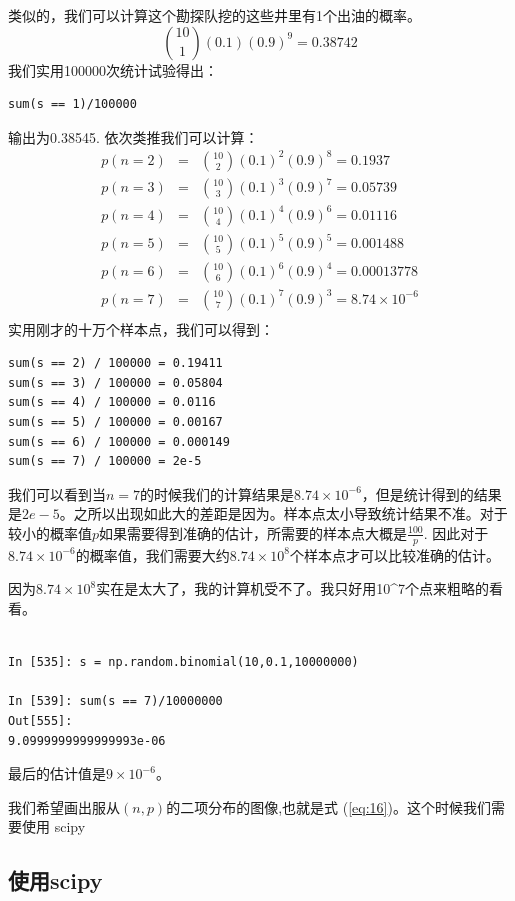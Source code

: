 \documentclass[10pt,a4paper,UTF8]{article}
\begin{document}
类似的，我们可以计算这个勘探队挖的这些井里有1个出油的概率。
\begin{equation}
\label{eq:14}
\binom{10}{1}(0.1)(0.9)^{9} = 0.38742
\end{equation}
我们实用100000次统计试验得出：
\lstset{language=Python,label= ,caption= ,captionpos=b,numbers=none}
\begin{lstlisting}
sum(s == 1)/100000
\end{lstlisting}
输出为0.38545.
依次类推我们可以计算：
\begin{eqnarray}
\label{eq:16}
p(n=2)&=&\binom{10}{2}(0.1)^{2}(0.9)^{8} = 0.1937  \\
p(n=3)&=&\binom{10}{3}(0.1)^{3}(0.9)^{7} = 0.05739 \\
p(n=4)&=&\binom{10}{4}(0.1)^{4}(0.9)^{6} = 0.01116  \\
p(n=5)&=&\binom{10}{5}(0.1)^{5}(0.9)^{5} = 0.001488 \\
p(n=6)&=&\binom{10}{6}(0.1)^{6}(0.9)^{4} = 0.00013778  \\
p(n=7)&=&\binom{10}{7}(0.1)^{7}(0.9)^{3} = 8.74\times 10^{-6}   \\
\end{eqnarray}
实用刚才的十万个样本点，我们可以得到：
\begin{verbatim}
sum(s == 2) / 100000 = 0.19411
sum(s == 3) / 100000 = 0.05804
sum(s == 4) / 100000 = 0.0116
sum(s == 5) / 100000 = 0.00167
sum(s == 6) / 100000 = 0.000149
sum(s == 7) / 100000 = 2e-5
\end{verbatim}
我们可以看到当\(n=7\)的时候我们的计算结果是\(8.74\times 10^{-6}\)，但是统计得到的结果是\(2e-5\)。之所以出现如此大的差距是因为。样本点太小导致统计结果不准。对于较小的概率值\(p\)如果需要得到准确的估计，所需要的样本点大概是\(\frac{100}{p}\). 因此对于\(8.74\times 10^{-6}\)的概率值，我们需要大约\(8.74\times 10^{8}\)个样本点才可以比较准确的估计。

因为\(8.74\times 10^{8}\)实在是太大了，我的计算机受不了。我只好用10\^{}7个点来粗略的看看。
\begin{verbatim}

In [535]: s = np.random.binomial(10,0.1,10000000)

In [539]: sum(s == 7)/10000000
Out[555]:
9.0999999999999993e-06

\end{verbatim}
最后的估计值是\(9\times 10^{-6}\)。

我们希望画出服从\((n,p)\)的二项分布的图像,也就是式 (\ref{eq:16})。这个时候我们需要使用 scipy

\subsection{使用scipy}
\label{sec:org6e8d678}
\end{document}
